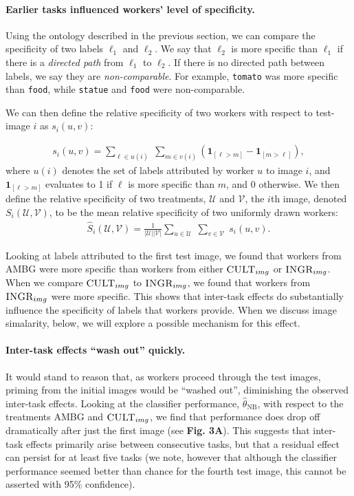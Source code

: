 \documentclass[letterpaper]{article}
\begin{document}
\paragraph{Earlier tasks influenced workers' level of specificity.} 
Using the ontology described in the previous section, we can compare the 
specificity of two labels $\ell_1$ and $\ell_2$. We say that $\ell_2$ is more 
specific than $\ell_1$ if there is a \textit{directed path} from $\ell_1$ to 
$\ell_2$.  If there is no directed path between labels, we say they are  
\textit{non-comparable}.  For example, \texttt{tomato} was more specific than 
\texttt{food}, while \texttt{statue} and \texttt{food} were non-comparable.

We can then define the relative specificity of two workers with respect to 
test-image $i$ as $s_i(u,v)$:

\begin{align}
	s_i(u,v) = \sum_{\ell \in u(i) } \;
	\sum_{m \in v(i)} 
	\left(\mathbf{1}_{[\ell > m]} - \mathbf{1}_{[m>\ell]}\right),
	\label{eq:worker-specificity}
\end{align}
where $u(i)$ denotes the set of labels attributed by worker $u$ to image $i$, 
and $\mathbf{1}_{[\ell > m]}$ evaluates to 1 if $\ell$ is more specific than 
$m$, and 0 otherwise.
We then define the relative specificity of two treatments, $\mathcal{U}$ and 
$\mathcal{V}$, the $i$th image, denoted $S_i(\mathcal{U},\mathcal{V})$, to be 
the mean relative specificity of two uniformly drawn workers:  
\begin{align}
	\hat{S}_i(\mathcal{U},\mathcal{V}) = 
	\frac{1}{|\mathcal{U}| |\mathcal{V}|}
	\sum_{u \in \mathcal{U}} \;
	\sum_{v \in \mathcal{V}} \;
		s_i(u,v).
		\label{eq:specificity}
\end{align}

Looking at labels attributed to the first test image, we found that workers 
from \textsc{AMBG} were more specific than workers from
either $\textsc{CULT}_{img}$ or $\textsc{INGR}_{img}$.  When we compare 
$\textsc{CULT}_{img}$ to $\textsc{INGR}_{img}$, we found that workers from
$\textsc{INGR}_{img}$ were more specific.  This shows that inter-task 
effects do substantially influence the specificity of labels that workers 
provide.  When we discuss image simalarity, below, we will explore a possible
mechanism for this effect.
\paragraph{Inter-task effects ``wash out'' quickly.}  
It would stand to reason that, as workers proceed through the test images, 
priming from the initial images would be ``washed out'', diminishing the 
observed inter-task effects.
Looking at the classifier performance, $\hat{\theta}_\text{NB}$, with respect 
to the treatments \textsc{AMBG} and $\textsc{CULT}_{img}$, we find that 
performance does drop off dramatically after just the first image 
(see \textbf{Fig. 3A}).
This suggests that inter-task effects primarily arise between consecutive 
tasks, but that a residual effect can persist for at least five tasks (we 
note, however that although the classifier performance seemed better than 
chance for the fourth test image, this cannot be asserted with 95\% 
confidence).
\end{document}
